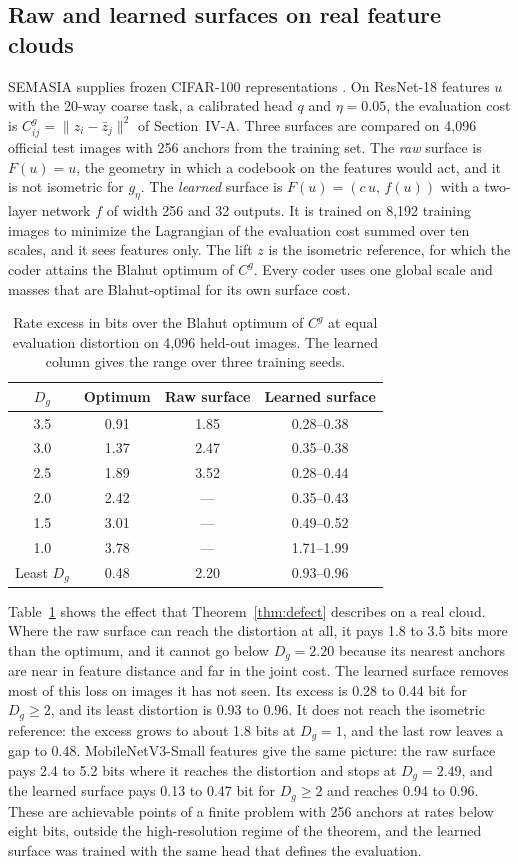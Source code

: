 \documentclass[journal]{IEEEtran}
\begin{document}
\subsection{Raw and learned surfaces on real feature clouds}
SEMASIA supplies frozen CIFAR-100 representations \cite{semasia}. On ResNet-18 features $u$ with the 20-way coarse task, a calibrated head $q$ and $\eta=0.05$, the evaluation cost is $C^g_{ij}=\|z_i-\bar z_j\|^2$ of Section~IV-A. Three surfaces are compared on 4,096 official test images with 256 anchors from the training set. The \emph{raw} surface is $F(u)=u$, the geometry in which a codebook on the features would act, and it is not isometric for $g_\eta$. The \emph{learned} surface is $F(u)=(c\,u,\,f(u))$ with a two-layer network $f$ of width 256 and 32 outputs. It is trained on 8,192 training images to minimize the Lagrangian of the evaluation cost summed over ten scales, and it sees features only. The lift $z$ is the isometric reference, for which the coder attains the Blahut optimum of $C^g$. Every coder uses one global scale and masses that are Blahut-optimal for its own surface cost.
\begin{table}[t]
\caption{Rate excess in bits over the Blahut optimum of $C^g$ at equal evaluation distortion on 4,096 held-out images. The learned column gives the range over three training seeds.}\label{tab:real}\centering
\begin{tabular}{cccc}\toprule
$D_g$ & Optimum & Raw surface & Learned surface\\\midrule
3.5 & 0.91 & 1.85 & 0.28--0.38\\
3.0 & 1.37 & 2.47 & 0.35--0.38\\
2.5 & 1.89 & 3.52 & 0.28--0.44\\
2.0 & 2.42 & --- & 0.35--0.43\\
1.5 & 3.01 & --- & 0.49--0.52\\
1.0 & 3.78 & --- & 1.71--1.99\\\midrule
Least $D_g$ & 0.48 & 2.20 & 0.93--0.96\\\bottomrule
\end{tabular}\end{table}
Table~\ref{tab:real} shows the effect that Theorem~\ref{thm:defect} describes on a real cloud. Where the raw surface can reach the distortion at all, it pays 1.8 to 3.5 bits more than the optimum, and it cannot go below $D_g=2.20$ because its nearest anchors are near in feature distance and far in the joint cost. The learned surface removes most of this loss on images it has not seen. Its excess is 0.28 to 0.44 bit for $D_g\ge2$, and its least distortion is 0.93 to 0.96. It does not reach the isometric reference: the excess grows to about 1.8 bits at $D_g=1$, and the last row leaves a gap to 0.48. MobileNetV3-Small features give the same picture: the raw surface pays 2.4 to 5.2 bits where it reaches the distortion and stops at $D_g=2.49$, and the learned surface pays 0.13 to 0.47 bit for $D_g\ge2$ and reaches 0.94 to 0.96. These are achievable points of a finite problem with 256 anchors at rates below eight bits, outside the high-resolution regime of the theorem, and the learned surface was trained with the same head that defines the evaluation.
\end{document}
